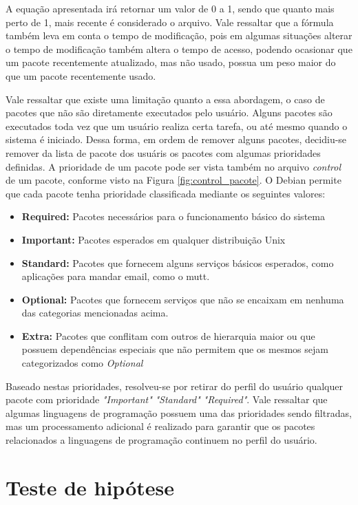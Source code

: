 A equação apresentada irá retornar um valor de 0 a 1, sendo que quanto mais
perto de 1, mais recente é considerado o arquivo. Vale ressaltar que a fórmula
também leva em conta o tempo de modificação, pois em algumas situações alterar o
tempo de modificação também altera o tempo de acesso, podendo ocasionar que um
pacote recentemente atualizado, mas não usado, possua um peso maior do que um
pacote recentemente usado.

Vale ressaltar que existe uma limitação quanto a essa abordagem, o caso de
pacotes que não são diretamente executados pelo usuário. Alguns pacotes são
executados toda vez que um usuário realiza certa tarefa, ou até mesmo quando o
sistema é iniciado. Dessa forma, em ordem de remover alguns pacotes, decidiu-se
remover da lista de pacote dos usuáris os pacotes com algumas prioridades definidas.
A prioridade de um pacote pode ser vista também no arquivo \textit{control} de um pacote, conforme visto
na Figura \ref{fig:control_pacote}. O Debian permite que cada pacote tenha
prioridade classificada mediante os seguintes valores:

\begin{itemize}
    \item \textbf{Required:} Pacotes necessários para o funcionamento básico do
        sistema
    \item \textbf{Important:} Pacotes esperados em qualquer distribuição Unix
    \item \textbf{Standard:} Pacotes que fornecem alguns serviços básicos
        esperados, como aplicações para mandar email, como o mutt.
    \item \textbf{Optional:} Pacotes que fornecem serviços que não se encaixam
        em nenhuma das categorias mencionadas acima.
    \item \textbf{Extra:} Pacotes que conflitam com outros de hierarquia maior
        ou que possuem dependências especiais que não permitem que os mesmos
        sejam categorizados como \textit{Optional}
\end{itemize}

Baseado nestas prioridades, resolveu-se por retirar do perfil do usuário
qualquer pacote com prioridade \textit{"Important"} \textit{"Standard"}
\textit{"Required"}. Vale ressaltar que algumas linguagens de programação
possuem uma das prioridades sendo filtradas, mas um processamento adicional é
realizado para garantir que os pacotes relacionados a linguagens de programação
continuem no perfil do usuário.

\section{Teste de hipótese}

